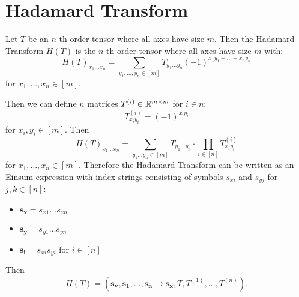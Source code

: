 \section{Hadamard Transform}
Let $T$ be an $n$-th order tensor where all axes have size $m$.
Then the Hadamard Transform $H(T)$ is the $n$-th order tensor where all axes have size $m$ with:
$$H(T)_{x_1 \dots x_n} = \sum\limits_{y_1, \dots, y_n \in [m]} T_{y_1 \dots y_n} (-1)^{x_1 y_1 + \ldots + x_n y_n}$$
for $x_1,\dots,x_n \in [m]$.

Then we can define $n$ matrices $T^{(i)} \in \mathbb{R}^{m \times m}$ for $i \in n$:
$$T^{(i)}_{x_i y_i} = (-1)^{x_i y_i}$$
for $x_i, y_i \in [m]$.
Then
$$H(T)_{x_1 \dots x_n} = \sum\limits_{y_1 \dots y_n \in [m]} T_{y_1 \dots y_n} \cdot \prod\limits_{i \in [n]} T^{(i)}_{x_i y_i}$$
for $x_1,\dots,x_n \in [m]$.
Therefore the Hadamard Transform can be written as an Einsum expression with index strings consisting of symbols $s_{xi}$ and $s_{yj}$ for $j,k \in [n]$:
\begin{itemize}
    \item $\bm{s_x} = s_{x1}\dots s_{x n}$
    \item $\bm{s_y} = s_{y1}\dots s_{y n}$
    \item $\bm{s_i} = s_{xi} s_{yi}$ for $i \in [n]$
\end{itemize}
Then
$$H(T) = (\bm{s_y}, \bm{s_1}, \dots, \bm{s_n} \rightarrow \bm{s_x}, T, T^{(1)}, \dots, T^{(n)}).$$